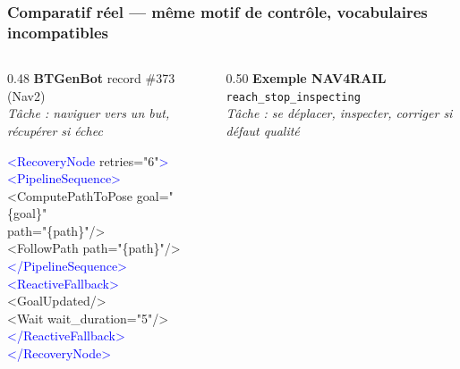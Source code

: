 \documentclass[aspectratio=169]{beamer}
\begin{document}
\begin{frame}[shrink=10]
  \frametitle{Comparatif réel --- même motif de contrôle, vocabulaires incompatibles}

  \begin{columns}[T]
    \begin{column}{0.48\textwidth}
      {\small\textbf{BTGenBot} \textemdash{} record \#373 (Nav2)}\\
      {\scriptsize\textit{Tâche : naviguer vers un but, récupérer si échec}}

      \vspace{0.1em}
      {\ttfamily\scriptsize\noindent%
\textcolor{blue}{<RecoveryNode} retries="6"\textcolor{blue}{>}\\[0pt]%
\hspace{0.6em}\textcolor{blue}{<PipelineSequence>}\\[0pt]%
\hspace{1.2em}<ComputePathToPose goal="\{goal\}"\\[0pt]%
\hspace{2.4em}path="\{path\}"/>\\[0pt]%
\hspace{1.2em}<FollowPath path="\{path\}"/>\\[0pt]%
\hspace{0.6em}\textcolor{blue}{</PipelineSequence>}\\[0pt]%
\hspace{0.6em}\textcolor{blue}{<ReactiveFallback>}\\[0pt]%
\hspace{1.2em}<GoalUpdated/>\\[0pt]%
\hspace{1.2em}<Wait wait\_duration="5"/>\\[0pt]%
\hspace{0.6em}\textcolor{blue}{</ReactiveFallback>}\\[0pt]%
\textcolor{blue}{</RecoveryNode>}%
      }
    \end{column}
    \begin{column}{0.50\textwidth}
      {\small\textbf{Exemple NAV4RAIL} \textemdash{} \texttt{reach\_stop\_inspecting}}\\
      {\scriptsize\textit{Tâche : se déplacer, inspecter, corriger si défaut qualité}}


\end{column}
\end{columns}
\end{frame}
\end{document}
